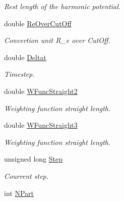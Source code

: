 \begin{DoxyCompactItemize}
\begin{DoxyCompactList}\small\item\em Rest length of the harmonic potential. \end{DoxyCompactList}\item 
double \hyperlink{structGENERAL_aa72817c7da02760c6940e2e2fcea5f02}{Re\+Over\+Cut\+Off}\hypertarget{structGENERAL_aa72817c7da02760c6940e2e2fcea5f02}{}\label{structGENERAL_aa72817c7da02760c6940e2e2fcea5f02}

\begin{DoxyCompactList}\small\item\em Convertion unit R\+\_\+e over Cut\+Off. \end{DoxyCompactList}\item 
double \hyperlink{structGENERAL_ac321dc561843cb5d3f74604036a3a8da}{Deltat}\hypertarget{structGENERAL_ac321dc561843cb5d3f74604036a3a8da}{}\label{structGENERAL_ac321dc561843cb5d3f74604036a3a8da}

\begin{DoxyCompactList}\small\item\em Timestep. \end{DoxyCompactList}\item 
double \hyperlink{structGENERAL_a3e95eddffbcb7d50ef9588ced78a148c}{W\+Func\+Straight2}\hypertarget{structGENERAL_a3e95eddffbcb7d50ef9588ced78a148c}{}\label{structGENERAL_a3e95eddffbcb7d50ef9588ced78a148c}

\begin{DoxyCompactList}\small\item\em Weighting function straight length. \end{DoxyCompactList}\item 
double \hyperlink{structGENERAL_a2db5cd020420567f6c9414964981a572}{W\+Func\+Straight3}\hypertarget{structGENERAL_a2db5cd020420567f6c9414964981a572}{}\label{structGENERAL_a2db5cd020420567f6c9414964981a572}

\begin{DoxyCompactList}\small\item\em Weighting function straight length. \end{DoxyCompactList}\item 
unsigned long \hyperlink{structGENERAL_a7d089b5d5a5a8f8699325baad0ad85b5}{Step}\hypertarget{structGENERAL_a7d089b5d5a5a8f8699325baad0ad85b5}{}\label{structGENERAL_a7d089b5d5a5a8f8699325baad0ad85b5}

\begin{DoxyCompactList}\small\item\em Courrent step. \end{DoxyCompactList}\item 
int \hyperlink{structGENERAL_abdcc792391d8c5092471dff191de47f4}{N\+Part}\hypertarget{structGENERAL_abdcc792391d8c5092471dff191de47f4}{}\label{structGENERAL_abdcc792391d8c5092471dff191de47f4}


\end{DoxyCompactItemize}
